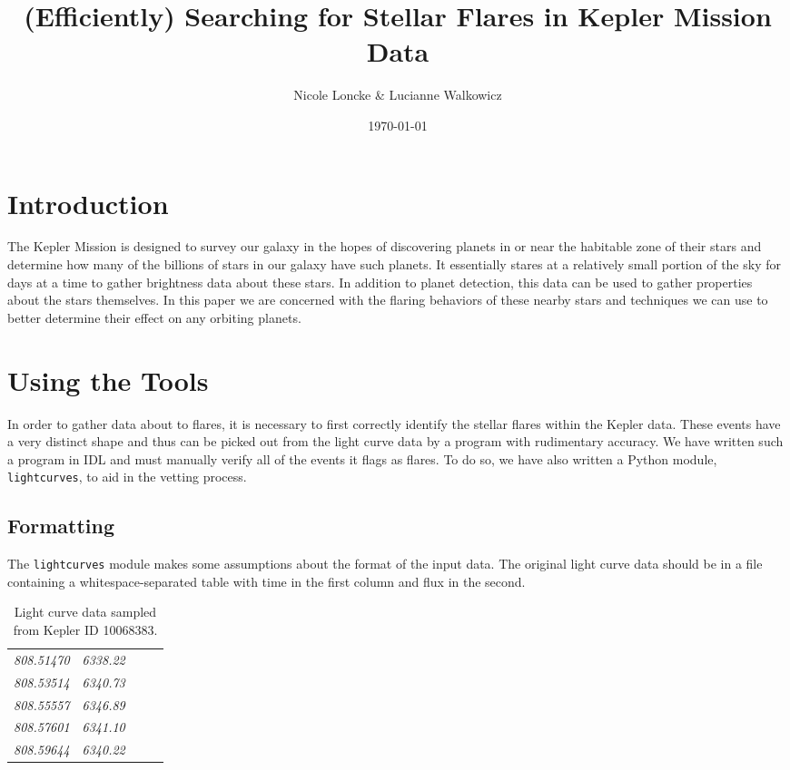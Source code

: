 \documentclass[11pt]{article}
\author{Nicole Loncke \& Lucianne Walkowicz}
\date{\today}
\title{(Efficiently) Searching for Stellar Flares in Kepler Mission Data}
\begin{document}
\maketitle{}

\section{Introduction}
\label{sec:intro}

The Kepler Mission is designed to survey our galaxy in the hopes of
discovering planets in or near the habitable zone of their stars and
determine how many of the billions of stars in our galaxy have such
planets. It essentially stares at a relatively small portion of the
sky for days at a time to gather brightness data about these stars.
In addition to planet detection, this data can be used to gather
properties about the stars themselves.  In this paper we are concerned
with the flaring behaviors of these nearby stars and techniques we can
use to better determine their effect on any orbiting planets.


\section{Using the Tools}
\label{sec:tools}
In order to gather data about to flares, it is necessary to first
correctly identify the stellar flares within the Kepler data.  These
events have a very distinct shape and thus can be picked out from the
light curve data by a program with rudimentary accuracy.  We have
written such a program in IDL and must manually verify all of the
events it flags as flares.  To do so, we have also written a Python
module, \verb|lightcurves|, to aid in the vetting process.

\subsection{Formatting}
\label{sec:format}

The \verb|lightcurves| module makes some assumptions about the format
of the input data.  The original light curve data should be in a file
containing a whitespace-separated table with time in the first column
and flux in the second.
\begin{table}[h]
  \centering
  \begin{tabular}{>{\itshape}p{0.2\linewidth} >{\itshape}l}
       808.51470   &   6338.22 \\
       808.53514   &   6340.73 \\
       808.55557   &   6346.89 \\
       808.57601   &   6341.10 \\
       808.59644   &   6340.22 \\
  \end{tabular}
  \caption{Light curve data sampled from Kepler ID 10068383.}
\end{table}
\end{document}
